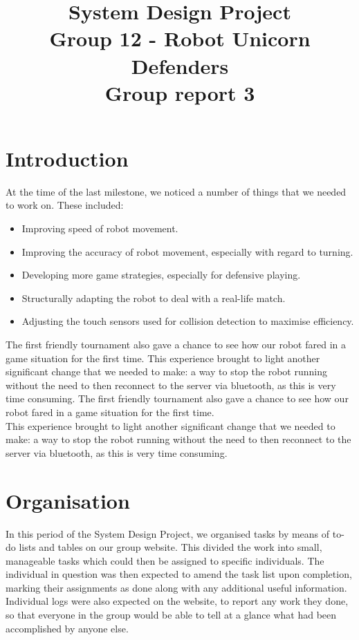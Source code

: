 \documentclass[conference,12pt]{IEEEtran}
\begin{document}
	
\title{System Design Project
	\\Group 12 - Robot Unicorn Defenders
	\\Group report 3}

\author{
}
	
\maketitle
{}
\IEEEpeerreviewmaketitle

\pagebreak
	
\section{Introduction}
At the time of the last milestone, we noticed a number of things that we needed to work on. These included:
\begin{itemize}
\item Improving speed of robot movement.
\item Improving the accuracy of robot movement, especially with regard to turning.
\item Developing more game strategies, especially for defensive playing.
\item Structurally adapting the robot to deal with a real-life match. 
\item Adjusting the touch sensors used for collision detection to maximise efficiency.
\end{itemize}
The first friendly tournament also gave a chance to see how our robot fared in a game situation for the first time. This experience brought to light another significant change that we needed to make: a way to stop the robot running without the need to then reconnect to the server via bluetooth, as this is very time consuming. The first friendly tournament also gave a chance to see how our robot fared in a game situation for the first time. \\This experience brought to light another significant change that we needed to make: a way to stop the robot running without the need to then reconnect to the server via bluetooth, as this is very time consuming. 

\section{Organisation}
In this period of the System Design Project, we organised tasks by means of to-do lists and tables on our group website. This divided the work into small, manageable tasks which could then be assigned to specific individuals. The individual in question was then expected to amend the task list upon completion, marking their assignments as done along with any additional useful information. Individual logs were also expected on the website, to report any work they done, so that everyone in the group would be able to tell at a glance what had been accomplished by anyone else.   
\end{document}
